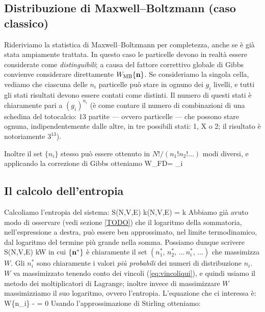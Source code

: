 \subsection{Distribuzione di Maxwell--Boltzmann (caso classico)}
Rideriviamo la statistica di Maxwell--Boltzmann per completezza, anche se è già stata ampiamente trattata. In questo caso le particelle devono in realtà essere considerate come {\em distinguibili}; a causa del fattore correttivo globale di Gibbs convienve considerare direttamente $W_{\textrm{\scriptsize MB}}\{\mathbf{n}\}$. Se consideriamo la singola cella, vediamo che ciascuna delle $n_{i}$ particelle può stare in ognuno dei $g_{i}$ livelli, e tutti gli stati risultati devono essere contati come distinti. Il numero di questi stati è chiaramente pari a $(g_{i})^{n_{i}}$ (è come contare il numero di combinazioni di una schedina del totocalcio: $13$ partite --- ovvero particelle --- che possono stare ognuna, indipendentemente dalle altre, in tre possibili stati: 1, X o 2; il risultato è notoriamente $3^{13}$).

Inoltre il set $\{n_{i}\}$ stesso può essere ottenuto in $N!/(n_{1}! n_{2}!\dots)$ modi diversi, e applicando la correzione di Gibbs otteniamo
\be
W_{\textrm{\scriptsize FD}}\nset = \prod_{i}
\ee

\subsection{Il calcolo dell'entropia}

Calcoliamo l'entropia del sistema:
\be
S(N,V,E) \equiv k\ln\Omega(N,V,E) = k\ln{}
\ee
Abbiamo già avuto modo di osservare (vedi sezione \ref{TODO}) %
che il logaritmo della sommatoria, nell'espressione a destra, può essere ben approssimato, nel limite termodinamico, dal logaritmo del termine più grande nella somma. Possiamo dunque scrivere
\be
S(N,V,E) \simeq k\ln W\nsetstar
\ee
in cui $\{\mathbf{n}^*\}$ è chiaramente il set $(n_1^*,\,n_2^*,\,\ldots\,n_i^*,\,\ldots)$ che massimizza $W$. Gli $n_{i}^{*}$ sono chiaramente i valori {\em più probabili} dei numeri di distribuzione $n_{i}$. $W$ va massimizzato tenendo conto dei vincoli (\ref{eq:vincoliqui}), e quindi usiamo il metodo dei moltiplicatori di Lagrange; inoltre invece di massimizzare $W$ massimizziamo il suo logaritmo, ovvero l'entropia. L'equazione che ci interessa è:
\be
\delta\ln W\{n_{i}\} -  = 0
\label{eq:varlnW}
\ee
Usando l'approssimazione di Stirling otteniamo: \\

